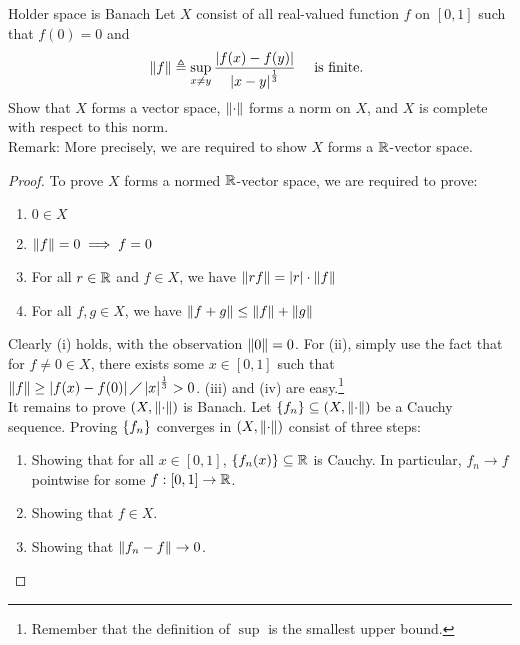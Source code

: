\documentclass{report}
\begin{document}
\begin{question}{Holder space is Banach}{}
Let $X$ consist of all real-valued function $f$ on  $[0,1]$ such that $f(0)=0$ and 
 \begin{align*}
\left\| f \right\|\triangleq \sup_{x\neq y} \frac{\left|f(x)-f(y)\right|}{\left|x-y\right|^{\frac{1}{3}}} \quad \text{ is finite. }
\end{align*}
Show that $X$ forms a vector space,  $\left\| \cdot \right\|$ forms a norm on $X$, and  $X$ is complete with respect to this norm. \\

Remark: More precisely, we are required to show $X$ forms a $\mathbb{R}$-vector space.
\end{question}
\begin{proof}
To prove $X$ forms a normed $\mathbb{R}$-vector space, we are required to prove:  
\begin{enumerate}[label=(\roman*)]
  \item $ 0 \in X$ 
  \item $\left\| f \right\|=0 \implies f=0$ 
  \item For all $r \in \mathbb{R}$ and $f \in X$, we have $ \left\| rf \right\|= \left|r\right| \cdot \left\| f \right\|$ 
  \item For all $f,g \in X$, we have $\left\| f+g \right\|\leq \left\| f \right\|+\left\| g \right\|$   
\end{enumerate}
Clearly (i) holds, with the observation $\left\| 0 \right\|=0$. For (ii), simply use the fact that for $f\neq 0 \in X$, there exists some $x\in [0,1]$ such that $\left\| f \right\|\geq \left|f(x)-f(0)\right|\diagup \left|x\right|^{\frac{1}{3}}>0$. (iii) and (iv) are easy.\footnote{Remember that the definition of $\sup$ is the smallest upper bound.}  \\














It remains to prove $(X,\left\| \cdot \right\|)$ is Banach. Let $\left\{ f_n \right\} \subseteq (X, \left\| \cdot  \right\|)$ be a Cauchy sequence. Proving $\left\{ f_n \right\}$ converges in $(X,\left\| \cdot \right\|)$ consist of three steps: 
\begin{enumerate}[label=(\roman*)]
  \item Showing that for all $x\in [0,1]$, $\left\{ f_n(x) \right\}\subseteq \mathbb{R}$ is Cauchy. In particular, $f_n \rightarrow f$ pointwise for some $f:[0,1]\rightarrow \mathbb{R}$. 
  \item Showing that $f\in X$. 
  \item Showing that $\left\| f_n-f \right\|\rightarrow 0$. 
\end{enumerate}



\end{proof}
\end{document}
